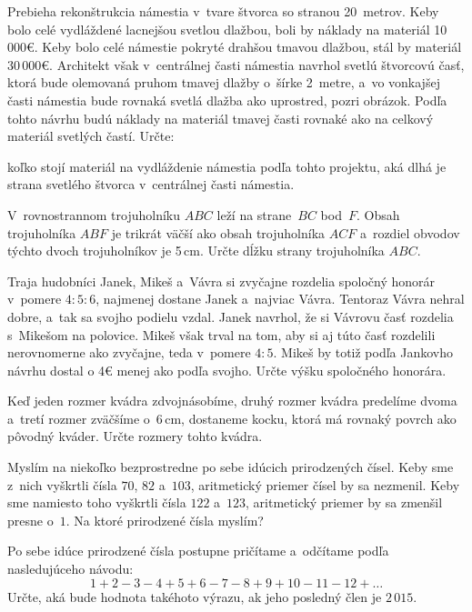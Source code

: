{%
Prebieha rekonštrukcia námestia v~tvare štvorca so stranou 20~metrov. Keby
bolo celé vydláždené lacnejšou svetlou dlažbou, boli by náklady na materiál
10\,000€. Keby bolo celé námestie pokryté drahšou tmavou dlažbou, stál by
materiál 30\,000€. Architekt však v~centrálnej časti námestia navrhol svetlú
štvorcovú časť, ktorá bude olemovaná pruhom tmavej dlažby o~šírke 2~metre,
a~vo vonkajšej časti námestia bude rovnaká svetlá dlažba ako uprostred,
pozri obrázok. Podľa tohto návrhu budú náklady na materiál tmavej časti
rovnaké ako na celkový materiál svetlých častí.
Určte:
\begin{itemize}
\iitem koľko stojí materiál na vydláždenie námestia podľa tohto projektu,
\iitem aká dlhá je strana svetlého štvorca v~centrálnej časti námestia.
\end{itemize}
}

{%
V~rovnostrannom trojuholníku $ABC$ leží na strane~$BC$ bod~$F$.
Obsah trojuholníka $ABF$ je trikrát väčší ako obsah trojuholníka $ACF$
a~rozdiel obvodov týchto dvoch trojuholníkov je 5\,cm.
Určte dĺžku strany trojuholníka $ABC$.
}

{%
Traja hudobníci Janek, Mikeš a~Vávra si zvyčajne rozdelia spoločný honorár
v~pomere $4:5:6$, najmenej dostane Janek a~najviac Vávra. Tentoraz Vávra
nehral dobre, a~tak sa svojho podielu vzdal. Janek navrhol, že si Vávrovu časť
rozdelia s~Mikešom na polovice. Mikeš však trval na tom, aby si aj túto časť
rozdelili nerovnomerne ako zvyčajne, teda v~pomere $4:5$. Mikeš by totiž
podľa Jankovho návrhu dostal o 4€ menej ako podľa svojho. Určte výšku
spoločného honorára.}

{%
Keď jeden rozmer kvádra zdvojnásobíme, druhý rozmer kvádra predelíme dvoma
a~tretí rozmer zväčšíme o~6\,cm, dostaneme kocku, ktorá má rovnaký
povrch ako pôvodný kváder. Určte rozmery tohto kvádra. }

{%
Myslím na niekoľko bezprostredne po sebe idúcich prirodzených čísel. Keby sme
z~nich vyškrtli čísla $70$, $82$ a~$103$, aritmetický priemer čísel by sa nezmenil. Keby sme
namiesto toho vyškrtli čísla $122$ a~$123$, aritmetický priemer by sa zmenšil presne o~$1$. Na
ktoré prirodzené čísla myslím?}

{%
Po sebe idúce prirodzené čísla postupne pričítame a~odčítame podľa nasledujúceho
návodu:
$$
1 + 2 - 3 - 4 + 5 + 6 - 7 - 8 + 9 + 10 - 11 - 12 + \dots
$$
Určte, aká bude hodnota takéhoto výrazu, ak jeho posledný člen je $2\,015$. }

